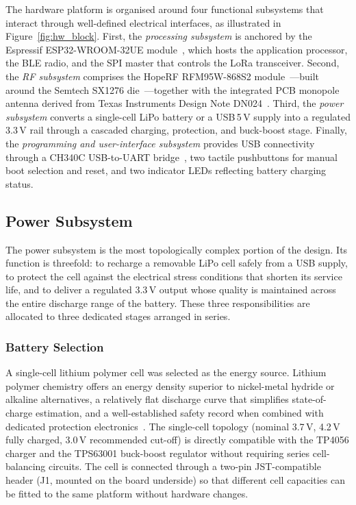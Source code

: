 \documentclass[english,bachelor]{tfgitic}[2026/01/22]
\begin{document}
The hardware platform is organised around four functional subsystems that interact
through well-defined electrical interfaces, as illustrated in
Figure~\ref{fig:hw_block}. First, the \emph{processing subsystem} is anchored by the
Espressif ESP32-WROOM-32UE module~\cite{espressif2023esp32wroom}, which hosts the
application processor, the BLE radio, and the SPI master that controls the LoRa
transceiver. Second, the \emph{RF subsystem} comprises the HopeRF RFM95W-868S2
module~\cite{hoperf2018rfm95w}---built around the Semtech SX1276 die~\cite{semtech2019sx1276}---together
with the integrated PCB monopole antenna derived from Texas Instruments Design Note
DN024~\cite{ti_dn024}. Third, the \emph{power subsystem} converts a single-cell LiPo battery
or a USB\,5\,V supply into a regulated 3.3\,V rail through a cascaded charging,
protection, and buck-boost stage. Finally, the \emph{programming and user-interface
subsystem} provides USB connectivity through a CH340C USB-to-UART bridge~\cite{ch340c2023},
two tactile pushbuttons for manual boot selection and reset, and two indicator LEDs
reflecting battery charging status.


\subsection{Power Subsystem}
\label{sec:hw_power}

The power subsystem is the most topologically complex portion of the design. Its
function is threefold: to recharge a removable LiPo cell safely from a USB supply,
to protect the cell against the electrical stress conditions that shorten its service
life, and to deliver a regulated 3.3\,V output whose quality is maintained across
the entire discharge range of the battery. These three responsibilities are allocated
to three dedicated stages arranged in series.


\subsubsection{Battery Selection}
\label{subsec:hw_battery}

A single-cell lithium polymer cell was selected as the energy source. Lithium polymer
chemistry offers an energy density superior to nickel-metal hydride or alkaline
alternatives, a relatively flat discharge curve that simplifies state-of-charge
estimation, and a well-established safety record when combined with dedicated
protection electronics~\cite{nanjing2023tp4056}. The single-cell topology (nominal
3.7\,V, 4.2\,V fully charged, 3.0\,V recommended cut-off) is directly compatible
with the TP4056 charger and the TPS63001 buck-boost regulator without requiring
series cell-balancing circuits. The cell is connected through a two-pin JST-compatible
header (J1, mounted on the board underside) so that different cell capacities can
be fitted to the same platform without hardware changes.
\end{document}
